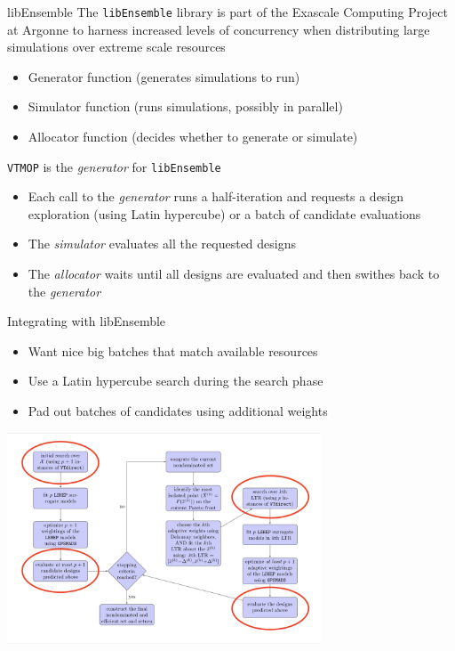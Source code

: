 \documentclass[xcolor=dvipsnames]{beamer}
\begin{document}
\begin{frame}{libEnsemble}
The {\tt libEnsemble} library is part of the Exascale Computing
Project at Argonne to harness increased levels of concurrency
when distributing large simulations over extreme scale resources
\begin{itemize}
\item Generator function (generates simulations to run)
\item Simulator function (runs simulations, possibly in parallel)
\item Allocator function (decides whether to generate or simulate)
\end{itemize}
\bigskip
\pause
\texttt{VTMOP} is the {\it generator} for {\tt libEnsemble}
\begin{itemize}
\item Each call to the {\it generator} runs a half-iteration and requests
a design exploration (using Latin hypercube) or a batch of candidate evaluations
\item The {\it simulator} evaluates all the requested designs
\item The {\it allocator} waits until all designs are evaluated and then
swithes back to the {\it generator}
\end{itemize}
\end{frame}
\begin{frame}{Integrating with libEnsemble}
\begin{itemize}
\item Want nice big batches that match available resources
\item Use a Latin hypercube search during the search phase
\item Pad out batches of candidates using additional weights
\end{itemize}
\begin{center}
\includegraphics[width=0.7\textwidth]{eval-chart.png}
\end{center}
\end{frame}
\end{document}
